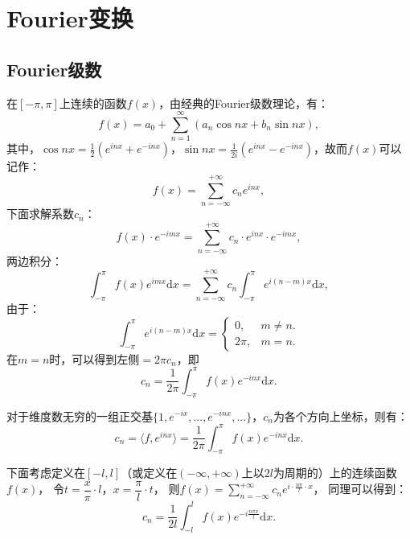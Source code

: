 \documentclass[openany,oneside]{ctexbook}
\begin{document}
\section{Fourier变换}
\subsection{Fourier级数}
在$[-\pi, \pi]$上连续的函数$f(x)$，由经典的Fourier级数理论，有：
\begin{equation}
    f(x)=a_0+\displaystyle\sum_{n=1}^\infty (a_n\cos nx+b_n\sin nx),
\end{equation}
其中，$\cos nx=\frac{1}{2}(e^{inx}+e^{-inx})，\sin nx=\frac{1}{2i}(e^{inx}-e^{-inx})$，故而$f(x)$可以记作：
\begin{equation}
    f(x)=\displaystyle\sum_{n=-\infty}^{+\infty}c_ne^{inx},
    \label{eq_fourier_fx_sumc}
\end{equation}
下面求解系数$c_n$：
\[f(x)\cdot e^{-imx}=\displaystyle\sum_{n=-\infty}^{+\infty}c_n\cdot e^{inx}\cdot e^{-imx},\]
两边积分：
\[\int_{-\pi}^\pi f(x)e^{imx}\mathrm{d}x=\displaystyle\sum_{n=-\infty}^{+\infty}c_n\int_{-\pi}^\pi e^{i(n-m)x}\mathrm{d}x,\]
由于：
\[\int_{-\pi}^\pi e^{i(n-m)x}\mathrm{d}x=
    \begin{cases}
        0, & m\neq n.\\
        2\pi, & m=n.
    \end{cases}
\]
在$m=n$时，可以得到左侧$=2\pi c_n$，即
\[c_n=\frac{1}{2\pi}\int_{-\pi}^\pi f(x)e^{-inx}\mathrm{d}x.\]

\begin{note*}[从线性空间视角理解Fourier级数]
    对于维度数无穷的一组正交基$\{1,e^{-ix},...,e^{-inx},...\}$，$c_n$为各个方向上坐标，则有：
    \[c_n=\langle f,e^{inx}\rangle=\frac{1}{2\pi}\int_{-\pi}^{\pi}f(x)e^{-inx}\mathrm{d}x.\]
\end{note*}

下面考虑定义在$[-l,l]$（或定义在$(-\infty,+\infty)$上以$2l$为周期的）上的连续函数$f(x)$，
令$t=\dfrac{x}{\pi}\cdot l$，$x=\dfrac{\pi}{l}\cdot t$，
则$f(x)=\displaystyle\sum_{n=-\infty}^{+\infty}c_ne^{i\cdot\frac{n\pi}{l}\cdot x}$，
同理可以得到：
\begin{equation}
    c_n=\frac{1}{2l}\int_{-l}^l f(x)e^{-i\frac{n\pi x}{l}}\mathrm{d}x.
    \label{eq:fourier_cn}
\end{equation}
\end{document}
